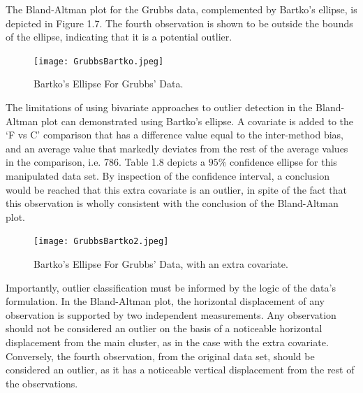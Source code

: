 \documentclass[12pt, a4paper]{report}
\begin{document}
	
	
	The Bland-Altman plot for the Grubbs data, complemented by Bartko's ellipse, is depicted in Figure 1.7.
	The fourth observation is shown to be outside the bounds of the ellipse, indicating that it is a potential outlier.
	
	
	\begin{figure}[h!]
		\texttt{[image: GrubbsBartko.jpeg]}
		\caption{Bartko's Ellipse For Grubbs' Data.}\label{GrubbsBartko}
	\end{figure}
	
	The limitations of using bivariate approaches to outlier detection
	in the Bland-Altman plot can demonstrated using Bartko's ellipse.
	A covariate is added to the `F vs C' comparison that has a
	difference value equal to the inter-method bias, and an average
	value that markedly deviates from the rest of the average values
	in the comparison, i.e. 786. Table 1.8 depicts a $95\%$ confidence
	ellipse for this manipulated data set. By inspection of the
	confidence interval, a conclusion would be reached that this extra
	covariate is an outlier, in spite of the fact that this
	observation is wholly consistent with the conclusion of the
	Bland-Altman plot.
	
	\begin{figure}[h!]
		\texttt{[image: GrubbsBartko2.jpeg]}
		\caption{Bartko's Ellipse For Grubbs' Data, with an extra covariate.}\label{GrubbsBartko2}
	\end{figure}
	
	
	Importantly, outlier classification must be informed by the logic of the
	data's formulation. In the Bland-Altman plot, the horizontal displacement of any
	observation is supported by two independent measurements. Any
	observation should not be considered an outlier on the basis of a
	noticeable horizontal displacement from the main cluster, as in
	the case with the extra covariate. Conversely, the fourth
	observation, from the original data set, should be considered an
	outlier, as it has a noticeable vertical displacement from the
	rest of the observations.
	
	
	
\end{document}
